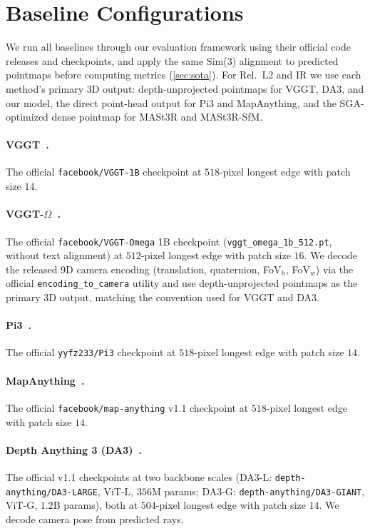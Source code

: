 


\section{Baseline Configurations}
\label{sec:suppl_baselines}

We run all baselines through our evaluation framework using their official code releases and checkpoints, and apply the same Sim(3) alignment to predicted pointmaps before computing metrics (\cref{sec:sota}). For Rel.~L2 and IR we use each method's primary 3D output: depth-unprojected pointmaps for VGGT, DA3, and our model, the direct point-head output for Pi3 and MapAnything, and the SGA-optimized dense pointmap for MASt3R and MASt3R-SfM.

\paragraph{VGGT~\citep{vggt}.}
The official \texttt{facebook/VGGT-1B} checkpoint at $518$-pixel longest edge with patch size $14$.

\paragraph{VGGT-$\Omega$~\citep{vggt_omega}.}
The official \texttt{facebook/VGGT-Omega} 1B checkpoint (\texttt{vggt\_omega\_1b\_512.pt}, without text alignment) at $512$-pixel longest edge with patch size $16$. We decode the released 9D camera encoding (translation, quaternion, FoV$_h$, FoV$_w$) via the official \texttt{encoding\_to\_camera} utility and use depth-unprojected pointmaps as the primary 3D output, matching the convention used for VGGT and DA3.

\paragraph{Pi3~\citep{wang2025pi}.}
The official \texttt{yyfz233/Pi3} checkpoint at $518$-pixel longest edge with patch size $14$. %

\paragraph{MapAnything~\citep{keetha2026mapanything}.}
The official \texttt{facebook/map-anything} v1.1 checkpoint at $518$-pixel longest edge with patch size $14$.

\paragraph{Depth Anything 3 (DA3)~\citep{lin2025depth}.}
The official v1.1 checkpoints at two backbone scales (DA3-L: \texttt{depth-anything/DA3-LARGE}, ViT-L, $356$M params; DA3-G: \texttt{depth-anything/DA3-GIANT}, ViT-G, $1.2$B params), both at $504$-pixel longest edge with patch size $14$. We decode camera pose from predicted rays.

